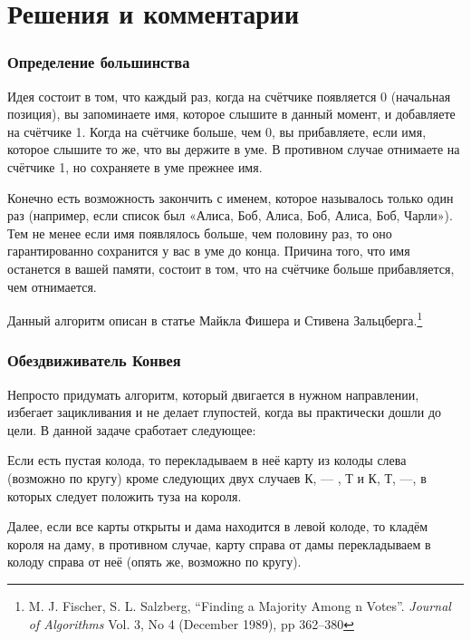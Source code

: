  \section*{Решения и комментарии}

\subsubsection*{Определение большинства}%

Идея состоит в том, что каждый раз, когда на счётчике появляется 0 (начальная позиция), 
вы запоминаете имя, которое слышите в данный момент, и добавляете на счётчике 1.
Когда на счётчике больше, чем 0, вы прибавляете, если имя, которое слышите то же, что вы держите в уме.
В противном случае отнимаете на счётчике 1, но сохраняете в уме прежнее имя.

Конечно есть возможность закончить с именем, которое называлось только один раз (например, если список был «Алиса, Боб, Алиса, Боб, Алиса, Боб, Чарли»).
Тем не менее если имя появлялось больше, чем половину раз, то оно гарантированно сохранится у вас в уме до конца.
Причина того, что имя останется в вашей памяти, состоит в том, что на счётчике больше прибавляется, чем отнимается.

Данный алгоритм описан в статье Майкла Фишера и Стивена Зальцберга.\footnote{M. J. Fischer, S. L. Salzberg, ``Finding a Majority Among n Votes''. \emph{Journal of Algorithms} Vol. 3, No 4 (December 1989), pp 362--380}

\subsubsection*{Обездвиживатель Конвея}%

Непросто придумать алгоритм, который двигается в нужном направлении, избегает зацикливания и не делает глупостей, когда вы практически дошли до цели.
В данной задаче сработает следующее:

\medskip

Если есть пустая колода, то перекладываем в неё карту из колоды слева (возможно по кругу) кроме следующих двух случаев К, --- , Т и К, Т, ---, в которых следует положить туза на короля.

Далее, если все карты открыты и дама находится в левой колоде, то кладём короля на даму, в противном случае, карту справа от дамы перекладываем в колоду справа от неё (опять же, возможно по кругу).

